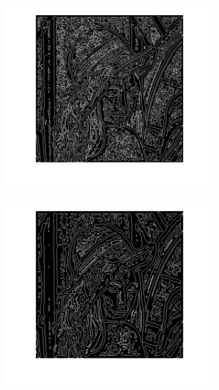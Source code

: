 \documentclass{article}
\begin{document}
\begin{figure}
        \centering
        \begin{subfigure}[b]{0.32\textwidth}
            \includegraphics[width=\textwidth]{Images/lena_log_2.png}
        \end{subfigure}
        \begin{subfigure}[b]{0.32\textwidth}
            \includegraphics[width=\textwidth]{Images/lena_log_3.png}

\end{subfigure}
\end{figure}
\end{document}
